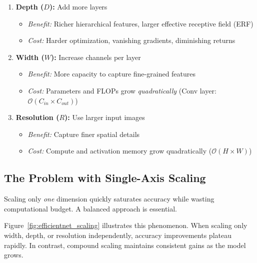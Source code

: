 \documentclass{article}
\begin{document}
\begin{enumerate}
    \item \textbf{Depth ($D$):} Add more layers
    \begin{itemize}
        \item \textit{Benefit:} Richer hierarchical features, larger effective receptive field (ERF)
        \item \textit{Cost:} Harder optimization, vanishing gradients, diminishing returns
    \end{itemize}
    
    \item \textbf{Width ($W$):} Increase channels per layer
    \begin{itemize}
        \item \textit{Benefit:} More capacity to capture fine-grained features
        \item \textit{Cost:} Parameters and FLOPs grow \textit{quadratically} (Conv layer: $\mathcal{O}(C_{in} \times C_{out})$)
    \end{itemize}
    
    \item \textbf{Resolution ($R$):} Use larger input images
    \begin{itemize}
        \item \textit{Benefit:} Capture finer spatial details
        \item \textit{Cost:} Compute and activation memory grow quadratically ($\mathcal{O}(H \times W)$)
    \end{itemize}
\end{enumerate}

\subsection{The Problem with Single-Axis Scaling}

\begin{tcolorbox}[colback=red!5!white, colframe=red!75!black, title=Critical Observation]
Scaling only \textit{one} dimension quickly saturates accuracy while wasting computational budget. A balanced approach is essential.
\end{tcolorbox}

Figure~\ref{fig:efficientnet_scaling} illustrates this phenomenon. When scaling only width, depth, or resolution independently, accuracy improvements plateau rapidly. In contrast, compound scaling maintains consistent gains as the model grows.
\end{document}
